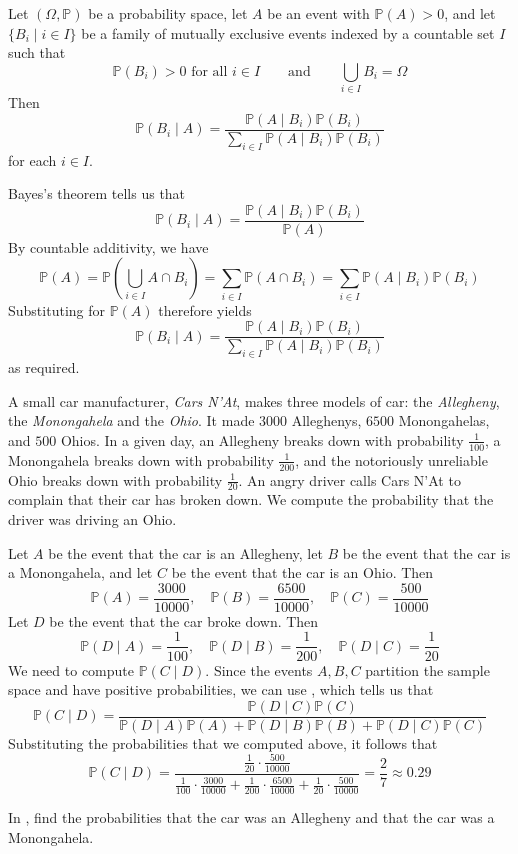 \begin{corollary}
\label{corBayesGeneral}
Let $(\Omega,\mathbb{P})$ be a probability space, let $A$ be an event with $\mathbb{P}(A)>0$, and let $\{ B_i \mid i \in I \}$ be a family of mutually exclusive events indexed by a countable set $I$ such that
\[ \mathbb{P}(B_i) > 0 \text{ for all } i \in I \qquad \text{and} \qquad \bigcup_{i \in I} B_i = \Omega \]
Then
\[ \mathbb{P}(B_i \mid A) = \frac{\mathbb{P}(A \mid B_i) \mathbb{P}(B_i)}{\sum_{i \in I} \mathbb{P}(A \mid B_i)\mathbb{P}(B_i)} \]
for each $i \in I$.
\end{corollary}
\begin{cproof}
Bayes's theorem tells us that
\[ \mathbb{P}(B_i \mid A) = \frac{\mathbb{P}(A \mid B_i) \mathbb{P}(B_i)}{\mathbb{P}(A)} \]
By countable additivity, we have
\[ \mathbb{P}(A) = \mathbb{P}\left( \bigcup_{i \in I} A \cap B_i \right) = \sum_{i \in I} \mathbb{P}(A \cap B_i) = \sum_{i \in I} \mathbb{P}(A \mid B_i)\mathbb{P}(B_i) \]
Substituting for $\mathbb{P}(A)$ therefore yields
\[ \mathbb{P}(B_i \mid A) = \frac{\mathbb{P}(A \mid B_i) \mathbb{P}(B_i)}{\sum_{i \in I} \mathbb{P}(A \mid B_i)\mathbb{P}(B_i)} \]
as required.
\end{cproof}

\begin{example}
\label{exBayesCarCompany}
A small car manufacturer, \textit{Cars N'At}, makes three models of car: the \textit{Allegheny}, the \textit{Monongahela} and the \textit{Ohio}. It made $3000$ Alleghenys, $6500$ Monongahelas, and $500$ Ohios. In a given day, an Allegheny breaks down with probability $\frac{1}{100}$, a Monongahela breaks down with probability $\frac{1}{200}$, and the notoriously unreliable Ohio breaks down with probability $\frac{1}{20}$. An angry driver calls Cars N'At to complain that their car has broken down. We compute the probability that the driver was driving an Ohio.

Let $A$ be the event that the car is an Allegheny, let $B$ be the event that the car is a Monongahela, and let $C$ be the event that the car is an Ohio. Then
\[ \mathbb{P}(A) = \frac{3000}{10000}, \quad \mathbb{P}(B) = \frac{6500}{10000}, \quad \mathbb{P}(C) = \frac{500}{10000} \]
Let $D$ be the event that the car broke down. Then
\[ \mathbb{P}(D \mid A) = \frac{1}{100}, \quad \mathbb{P}(D \mid B) = \frac{1}{200}, \quad \mathbb{P}(D \mid C) = \frac{1}{20} \]
We need to compute $\mathbb{P}(C \mid D)$. Since the events $A,B,C$ partition the sample space and have positive probabilities, we can use , which tells us that
\[ \mathbb{P}(C \mid D) = \frac{\mathbb{P}(D \mid C)\mathbb{P}(C)}{\mathbb{P}(D \mid A)\mathbb{P}(A)+\mathbb{P}(D \mid B)\mathbb{P}(B)+\mathbb{P}(D \mid C)\mathbb{P}(C)} \]
Substituting the probabilities that we computed above, it follows that
\[ \mathbb{P}(C \mid D) = \frac{\frac{1}{20} \cdot \frac{500}{10000}}{\frac{1}{100} \cdot \frac{3000}{10000} + \frac{1}{200} \cdot \frac{6500}{10000} + \frac{1}{20} \cdot \frac{500}{10000}} = \frac{2}{7} \approx 0.29 \]
\end{example}

\begin{exercise}
In , find the probabilities that the car was an Allegheny and that the car was a Monongahela.
\end{exercise}